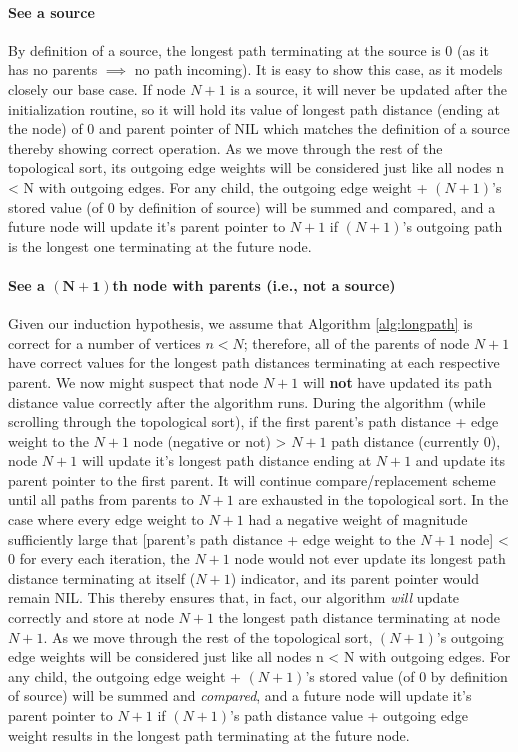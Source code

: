 \documentclass[conference]{styles/acmsiggraph}
\newcommand{\?}{\stackrel{?}{=}}
\newcommand\subsubsubsection{\paragraph}
\begin{document}
\subsubsubsection{See a source} \label{seeSource}
By definition of a source, the longest path terminating at the source is 0 (as it has no parents $\implies$ no path incoming).  It is easy to show this case, as it models closely our base case.  If node $N+1$ is a source, it will never be updated after the initialization routine, so it will hold its value of longest path distance (ending at the node) of 0 and parent pointer of NIL which matches the definition of a source thereby showing correct operation.  As we move through the rest of the topological sort, its outgoing edge weights will be considered just like all nodes n < N with outgoing edges.  For any child, the outgoing edge weight + $(N+1)$'s stored value (of 0 by definition of source) will be summed and compared, and a future node will update it's parent pointer to $N+1$ if $(N+1)$'s outgoing path is the longest one terminating at the future node.

\subsubsubsection{See a $\mathbf{(N+1)}$th node with parents (i.e., not a source)} \label{seeNotSource}
Given our induction hypothesis, we assume that Algorithm \ref{alg:longpath} is correct for a number of vertices $n < N$; therefore, all of the parents of node $N+1$ have correct values for the longest path distances terminating at each respective parent.  We now might suspect that node $N+1$ will \textbf{not} have updated its path distance value correctly after the algorithm runs.  During the algorithm (while scrolling through the topological sort), if the first parent's path distance + edge weight to the $N+1$ node (negative or not) > $N+1$ path distance (currently 0), node $N+1$ will update it's longest path distance ending at $N+1$ and update its parent pointer to the first parent.  It will continue compare/replacement scheme until all paths from parents to $N+1$ are exhausted in the topological sort.  In the case where every edge weight to $N+1$ had a negative weight of magnitude sufficiently large that [parent's path distance + edge weight to the $N+1$ node] < 0 for every each iteration, the $N+1$ node would not ever update its longest path distance terminating at itself ($N+1$) indicator, and its parent pointer would remain NIL.  This thereby ensures that, in fact, our algorithm \textit{will} update correctly and store at node $N+1$ the longest path distance terminating at node $N+1$. As we move through the rest of the topological sort, $(N+1)$'s outgoing edge weights will be considered just like all nodes n < N with outgoing edges.  For any child, the outgoing edge weight + $(N+1)$'s stored value (of 0 by definition of source) will be summed and \textit{compared}, and a future node will update it's parent pointer to $N+1$ if $(N+1)$'s path distance value + outgoing edge weight results in the longest path terminating at the future node. \\
\end{document}

